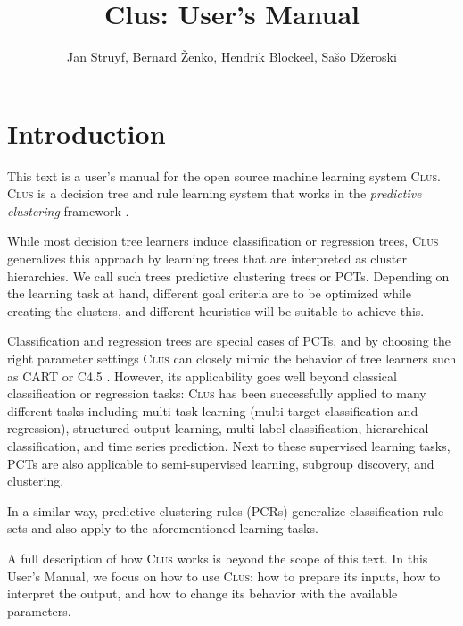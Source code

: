 \documentclass[a4paper]{report}
\newcommand{\clus}{\textsc{Clus}}
\begin{document}
\title{Clus: User's Manual}

\author{Jan Struyf, Bernard \v{Z}enko, Hendrik Blockeel, Sa\v{s}o D\v{z}eroski}

\maketitle



\tableofcontents



\chapter{Introduction}

This text is a user's manual for the open source machine learning system \clus{}. \clus{} is a decision tree and rule learning system that works in the \emph{predictive clustering} framework \cite{Blockeel1998icml}.

While most decision tree learners induce classification or regression trees, \clus{} generalizes this approach by learning trees that are interpreted as cluster hierarchies. We call such trees predictive clustering trees or PCTs. Depending on the learning task at hand, different goal criteria are to be optimized while creating the clusters, and different heuristics will be suitable to achieve this.

Classification and regression trees are special cases of PCTs, and by choosing the right parameter settings \clus{} can closely mimic the behavior of tree learners such as CART \cite{Breiman84:other} or C4.5 \cite{Quinlan1993}.  However, its applicability goes well beyond classical classification or regression tasks: \clus{} has been successfully applied to many different tasks including multi-task learning (multi-target classification and regression), structured output learning, multi-label classification, hierarchical classification, and time series prediction. Next to these supervised learning tasks, PCTs are also applicable to semi-supervised learning, subgroup discovery, and clustering.

In a similar way, predictive clustering rules (PCRs) generalize classification rule sets \cite{Clark91:proc} and also apply to the aforementioned learning tasks.

A full description of how \clus{} works is beyond the scope of this text. In this User's Manual, we focus on how to use \clus{}: how to prepare its inputs, how to interpret the output, and how to change its behavior with the available parameters.
\end{document}
